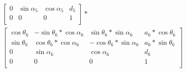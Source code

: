 \begin{multline}
\begin{bmatrix}
0 & \sin\alpha_5 & \cos\alpha_5 & d_5 \\
0 & 0 & 0 & 1 \\
\end{bmatrix}
*\\
\begin{bmatrix}
\cos\theta_6 & -\sin\theta_6*\cos\alpha_6 & \sin\theta_6*\sin\alpha_6 & a_6*\cos\theta_6 \\
\sin\theta_6 & \cos\theta_6*\cos\alpha_6 & -\cos\theta_6*\sin\alpha_6 & a_6*\sin\theta_6 \\
0 & \sin\alpha_6 & \cos\alpha_6 & d_6 \\
0 & 0 & 0 & 1 \\
\end{bmatrix}
\phantom{*}\\
\end{multline}
